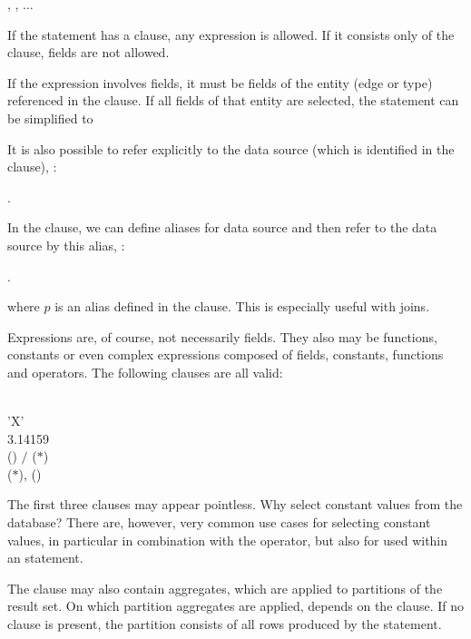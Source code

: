  , , $\dots$

If the statement has a  clause,
any expression is allowed.
If it consists only of the  clause,
fields are not allowed.

If the expression involves fields,
it must be fields of the entity (edge or type)
referenced in the  clause.
If all fields of that entity are selected,
the statement can be simplified to

 \keyword{$\ast$}

It is also possible to refer explicitly to the data source
(which is identified in the  clause), \eg:

 .

In the  clause, we can define aliases for data source
and then refer to the data source by this alias, \eg:

 .

where $p$ is an alias defined in the  clause.
This is especially useful with joins.

Expressions are, of course, not necessarily fields.
They also may be functions, constants or even complex expressions
composed of fields, constants, functions and operators.
The following clauses are all valid:

\begin{minipage}{\textwidth}
  \\
 'X' \\
 3.14159 \\
 () $/$ ($\ast$)\\
 ($\ast$), ()
\end{minipage}

The first three clauses may appear pointless.
Why select constant values from the database?
There are, however, very common use cases
for selecting constant values, in particular
in combination with the  operator,
but also for  used within an
 statement.

The  clause may also contain aggregates,
which are applied to partitions of the result set.
On which partition
aggregates are applied, depends 
on the  clause. If no  clause
is present, the partition consists of all rows produced
by the  statement.

